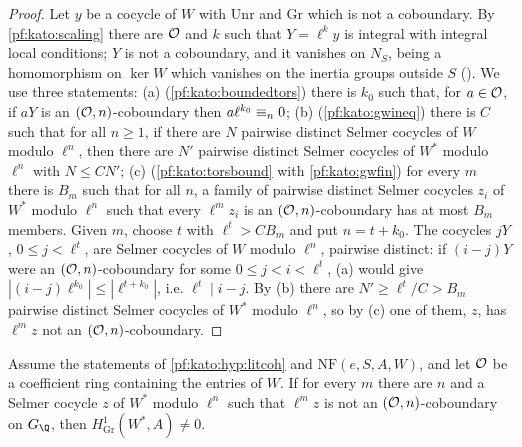 \begin{proof}
Let $y$ be a cocycle of $W$ with $\mathrm{Unr}$ and $\mathrm{Gr}$ which is not a coboundary. By \cref{pf:kato:scaling} there are $\mathcal{O}$ and $k$
such that $Y=\ell^ky$ is integral with integral local conditions; $Y$ is not a coboundary, and it vanishes on $N_S$, being a
homomorphism on $\ker W$ which vanishes on the inertia groups outside $S$
(). We use three statements:
(a) (\cref{pf:kato:boundedtors}) there is $k_0$ such that, for $a\in\mathcal{O}$, if $aY$ is an $(\mathcal{O},n)$-coboundary then $a\ell^{k_0}\equiv_{n}0$;
(b) (\cref{pf:kato:gwineq}) there is $C$ such that for all $n\ge1$, if there are $N$ pairwise distinct Selmer cocycles of $W$ modulo $\ell^n$,
then there are $N'$ pairwise distinct Selmer cocycles of $W^*$ modulo $\ell^n$ with $N\le CN'$;
(c) (\cref{pf:kato:torsbound} with \cref{pf:kato:gwfin}) for every $m$ there is $B_m$ such that for all $n$, a
family of pairwise distinct Selmer cocycles $z_i$ of $W^*$ modulo $\ell^n$ such that every $\ell^mz_i$ is an $(\mathcal{O},n)$-coboundary has at
most $B_m$ members.
Given $m$, choose $t$ with $\ell^t>CB_m$ and put $n=t+k_0$. The cocycles $jY$, $0\le j<\ell^t$, are Selmer cocycles of $W$ modulo $\ell^n$,
pairwise distinct: if $(i-j)Y$ were an $(\mathcal{O},n)$-coboundary for some $0\le j<i<\ell^t$, (a) would give $|(i-j)\ell^{k_0}|\le|\ell^{t+k_0}|$, i.e.
$\ell^t\mid i-j$. By (b) there are $N'\ge\ell^t/C>B_m$ pairwise distinct Selmer cocycles of $W^*$ modulo $\ell^n$, so by (c) one of them,
$z$, has $\ell^mz$ not an $(\mathcal{O},n)$-coboundary.
\end{proof}

\begin{theorem}\label{pf:kato:gwstep2}
Assume the statements of \cref{pf:kato:hyp:litcoh} and $\mathrm{NF}(e,S,A,W)$, and let $\mathcal{O}$ be a coefficient ring containing the entries
of $W$. If for every $m$ there are $n$ and a Selmer cocycle $z$ of $W^*$ modulo $\ell^n$ such that $\ell^mz$ is not an $(\mathcal{O},n)$-coboundary
on $G_\Q$, then $H^1_{\mathrm{Gr}}(W^*,A)\ne0$.
\end{theorem}


